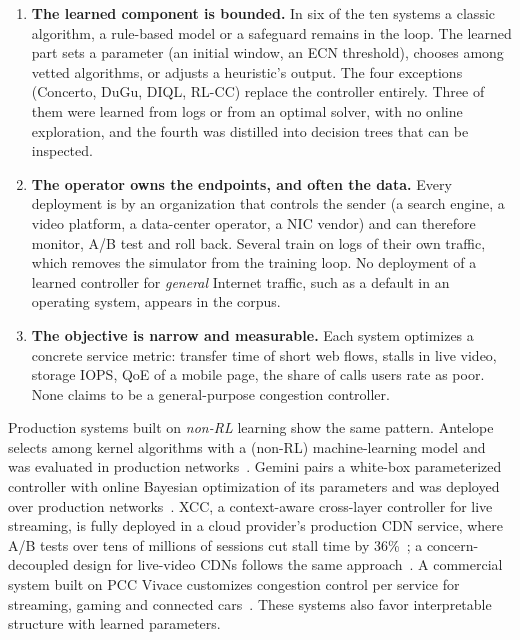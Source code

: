 \begin{enumerate}
  \item \textbf{The learned component is bounded.} In six of the ten systems a classic algorithm, a rule-based model or a safeguard remains in the loop. The learned part sets a parameter (an initial window, an ECN threshold), chooses among vetted algorithms, or adjusts a heuristic's output. The four exceptions (Concerto, DuGu, DIQL, RL-CC) replace the controller entirely. Three of them were learned from logs or from an optimal solver, with no online exploration, and the fourth was distilled into decision trees that can be inspected.
  \item \textbf{The operator owns the endpoints, and often the data.} Every deployment is by an organization that controls the sender (a search engine, a video platform, a data-center operator, a NIC vendor) and can therefore monitor, A/B test and roll back. Several train on logs of their own traffic, which removes the simulator from the training loop. No deployment of a learned controller for \emph{general} Internet traffic, such as a default in an operating system, appears in the corpus.
  \item \textbf{The objective is narrow and measurable.} Each system optimizes a concrete service metric: transfer time of short web flows, stalls in live video, storage IOPS, QoE of a mobile page, the share of calls users rate as poor. None claims to be a general-purpose congestion controller.
\end{enumerate}


\noindent Production systems built on \emph{non-RL} learning show the same pattern. Antelope selects among kernel algorithms with a (non-RL) machine-learning model and was evaluated in production networks~\cite{zhou2021antelope}. Gemini pairs a white-box parameterized controller with online Bayesian optimization of its parameters and was deployed over production networks~\cite{yang2023gemini}. XCC, a context-aware cross-layer controller for live streaming, is fully deployed in a cloud provider's production CDN service, where A/B tests over tens of millions of sessions cut stall time by 36\%~\cite{yuan2024context}; a concern-decoupled design for live-video CDNs follows the same approach~\cite{yuan2026concern}. A commercial system built on PCC Vivace customizes congestion control per service for streaming, gaming and connected cars~\cite{cohen2025unleashing}. These systems also favor interpretable structure with learned parameters.

